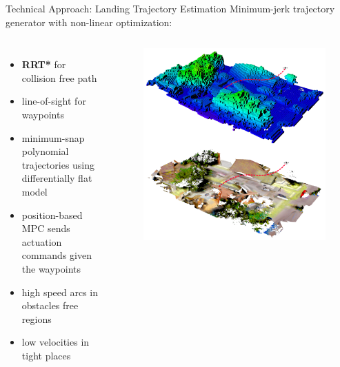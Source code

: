 \documentclass[10pt]{beamer}
\begin{document}
    \begin{frame}{Technical Approach: Landing Trajectory Estimation}
        Minimum-jerk trajectory generator with non-linear optimization:
        \begin{columns}[c,onlytextwidth]
                \justifying
                \begin{itemize}
                    \item \textbf{RRT*} for collision free path
                    \item line-of-sight for waypoints
                    \item minimum-snap polynomial trajectories using
                        differentially flat model
                    \item position-based MPC sends actuation commands
                        given the waypoints
                    \item high speed arcs in obstacles free regions
                    \item low velocities in tight places
                \end{itemize}
                \begin{figure}
                    \includegraphics[width=\textwidth]{images/Fig4.png}
                \end{figure}
        \end{columns}
    \end{frame}
\end{document}

